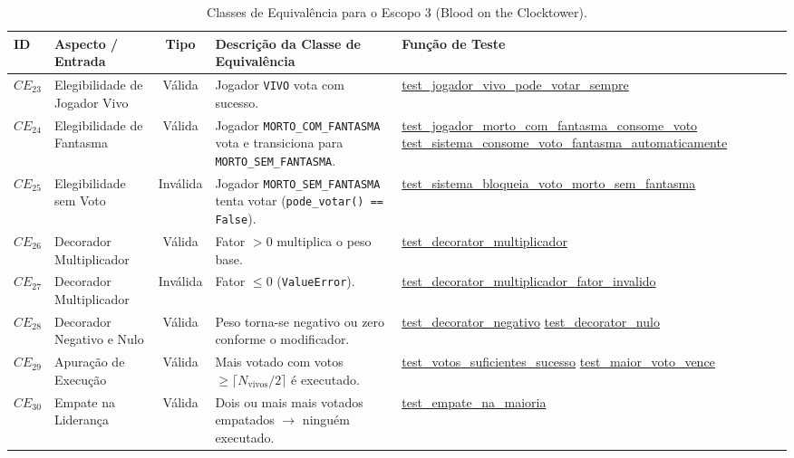 \documentclass[12pt,a4paper]{article}
\begin{document}
\small
\begin{xltabular}{\textwidth}{|l|Y|c|Y|Y|}

\caption{Classes de Equivalência para o Escopo 3 (Blood on the Clocktower).}
\label{tab:escopo3} \\

\hline
{}
\textbf{ID} & \textbf{Aspecto / Entrada} & \textbf{Tipo} &
\textbf{Descrição da Classe de Equivalência} &
\textbf{Função de Teste} \\ \hline

$CE_{23}$ & Elegibilidade de Jogador Vivo & Válida &
Jogador \texttt{VIVO} vota com sucesso. &
\url{test\_jogador\_vivo\_pode\_votar\_sempre} \\ \hline

$CE_{24}$ & Elegibilidade de Fantasma & Válida &
Jogador \texttt{MORTO\_COM\_FANTASMA} vota e transiciona para \texttt{MORTO\_SEM\_FANTASMA}. &
\url{test\_jogador\_morto\_com\_fantasma\_consome\_voto}
\newline
\newline
\url{test\_sistema\_consome\_voto\_fantasma\_automaticamente} \\ \hline

$CE_{25}$ & Elegibilidade sem Voto & Inválida &
Jogador \texttt{MORTO\_SEM\_FANTASMA} tenta votar (\texttt{pode\_votar() == False}). &
\url{test\_sistema\_bloqueia\_voto\_morto\_sem\_fantasma} \\ \hline

$CE_{26}$ & Decorador Multiplicador & Válida &
Fator $> 0$ multiplica o peso base. &
\url{test\_decorator\_multiplicador} \\ \hline

$CE_{27}$ & Decorador Multiplicador & Inválida &
Fator $\leq 0$ (\texttt{ValueError}). &
\url{test\_decorator\_multiplicador\_fator\_invalido} \\ \hline

$CE_{28}$ & Decorador Negativo e Nulo & Válida &
Peso torna-se negativo ou zero conforme o modificador. &
\url{test\_decorator\_negativo}
\newline
\newline
\url{test\_decorator\_nulo} \\ \hline

$CE_{29}$ & Apuração de Execução & Válida &
Mais votado com votos $\geq \lceil N_{\text{vivos}}/2 \rceil$ é executado. &
\url{test\_votos\_suficientes\_sucesso}
\newline
\newline
\url{test\_maior\_voto\_vence} \\ \hline

$CE_{30}$ & Empate na Liderança & Válida &
Dois ou mais mais votados empatados $\rightarrow$ ninguém executado. &
\url{test\_empate\_na\_maioria} \\ \hline

\end{xltabular}
\normalsize
\end{document}
